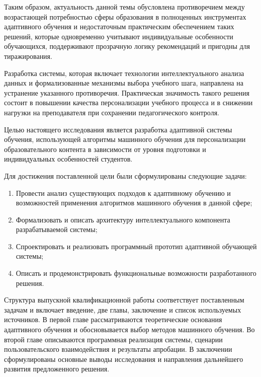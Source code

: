 Таким образом, актуальность данной темы обусловлена противоречием между
возрастающей потребностью сферы образования в полноценных инструментах
адаптивного обучения и недостаточным практическим обеспечением таких решений,
которые одновременно учитывают индивидуальные особенности обучающихся,
поддерживают прозрачную логику рекомендаций и пригодны для тиражирования.

Разработка системы, которая включает технологии интеллектуального анализа
данных и формализованные механизмы выбора учебного шага, направлена на
устранение указанного противоречия. Практическая значимость такого решения
состоит в повышении качества персонализации учебного процесса и в снижении
нагрузки на преподавателя при сохранении педагогического контроля.

Целью настоящего исследования является разработка адаптивной системы обучения,
использующей алгоритмы машинного обучения для персонализации образовательного
контента в зависимости от уровня подготовки и индивидуальных особенностей
студентов.

Для достижения поставленной цели были сформулированы следующие задачи:

\begin{enumerate}
  \item Провести анализ существующих подходов к адаптивному обучению и возможностей применения алгоритмов машинного обучения в данной сфере;
  \item Формализовать и описать архитектуру интеллектуального компонента разрабатываемой системы;
  \item Спроектировать и реализовать программный прототип адаптивной обучающей системы;
  \item Описать и продемонстрировать функциональные возможности разработанного решения.
\end{enumerate}

Структура выпускной квалификационной работы соответствует поставленным задачам
и включает введение, две главы, заключение и список используемых источников. В
первой главе рассматриваются теоретические основания адаптивного обучения и
обосновывается выбор методов машинного обучения. Во второй главе описываются
программная реализация системы, сценарии пользовательского взаимодействия и
результаты апробации. В заключении сформулированы основные выводы исследования
и направления дальнейшего развития предложенного решения.
